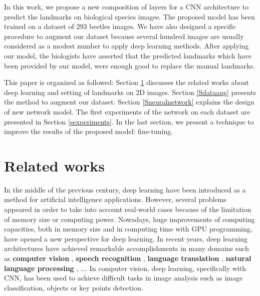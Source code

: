 \documentclass[review]{elsarticle}
\begin{document}
In this work, we propose a new composition of layers for a CNN architecture to predict the landmarks on biological species images. The proposed model has been trained on a dataset of $293$ beetles images. We have also designed a specific procedure to augment our dataset because several hundred images are usually considered as a modest number to apply deep learning methods. After applying our model, the biologists have asserted that the predicted landmarks which have been provided by our model, were enough good to replace the manual landmarks.

This paper is organized as followed: Section \ref{related_works} discusses the related works about deep learning and setting of landmarks on 2D images. Section \ref{Sdataaug} presents the method to augment our dataset. Section \ref{Sneuralnetwork} explains the design of new network model. The first experiments of the network on each dataset are presented in Section \ref{sexperiments}. In the last section, we present a technique to improve the results of the proposed model: fine-tuning.


\section{Related works}
\label{related_works}

In the middle of the previous century, deep learning \cite{lecun2015deep} have been introduced as a method for artificial intelligence applications. However, several problems  appeared in order to take into account real-world cases because of the limitation of memory size or computing power. Nowadays, huge improvements of computing capacities, both in memory size and in computing time with GPU programming, have opened a new perspective for deep learning. In recent years, deep learning architectures have achieved remarkable accomplishments in many domains such as \textbf{computer vision} \cite{lecun1998gradient, krizhevsky2012imagenet,  szegedy2015going,farabet2013learning,li2015convolutional}, \textbf{speech recognition} \cite{mikolov2011strategies, hinton2012deep}, \textbf{language translation} \cite{jean2014using, sutskever2014sequence}, \textbf{natural language processing} \cite{lecun2015deep, collobert2011natural, collobert2008unified}, \ldots. In computer vision, deep learning, specifically with CNN, has been used to achieve difficult tasks in image analysis such as image classification, objects or key points detection.
\end{document}
